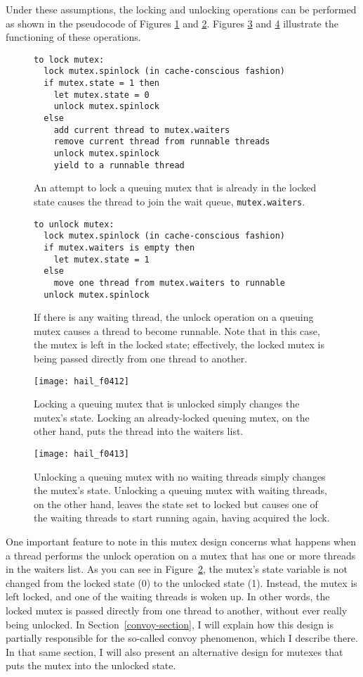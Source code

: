Under these assumptions, the locking and unlocking operations can be
performed as shown in the pseudocode of Figures \ref{lock-pseudo-code} and
\ref{unlock-pseudo-code}.  Figures \ref{scan-4-5} and \ref{scan-4-6}
illustrate the functioning of these operations.
\begin{figure}
\begin{verbatim}
to lock mutex:
  lock mutex.spinlock (in cache-conscious fashion)
  if mutex.state = 1 then
    let mutex.state = 0
    unlock mutex.spinlock
  else
    add current thread to mutex.waiters
    remove current thread from runnable threads
    unlock mutex.spinlock
    yield to a runnable thread
\end{verbatim}
\caption{An attempt to lock a queuing mutex that is already in the
  locked state causes the thread to join the wait queue, {\tt mutex.waiters}.}
\label{lock-pseudo-code}
\end{figure}
\begin{figure}
\begin{verbatim}
to unlock mutex:
  lock mutex.spinlock (in cache-conscious fashion)
  if mutex.waiters is empty then
    let mutex.state = 1
  else
    move one thread from mutex.waiters to runnable
  unlock mutex.spinlock
\end{verbatim}
\caption{If there is any waiting thread, the unlock operation on a queuing mutex causes a thread to become
  runnable. Note that in this case, the mutex is left in the locked
  state; effectively, the locked mutex is being passed directly from
  one thread to another.}
\label{unlock-pseudo-code}
\end{figure}
\begin{figure}
\centerline{\texttt{[image: hail\_f0412]}}
\caption{Locking a queuing mutex that is unlocked simply changes the
  mutex's state.  Locking an already-locked queuing mutex, on the
  other hand, puts the thread into the waiters list.}
\label{scan-4-5}
\end{figure}
\begin{figure}
\centerline{\texttt{[image: hail\_f0413]}}
\caption{Unlocking a queuing mutex with no waiting threads simply
  changes the mutex's state.  Unlocking a queuing mutex with waiting
  threads, on the other hand, leaves the state set to locked but
  causes one of the waiting threads to start running again, having
  acquired the lock.}
\label{scan-4-6}
\end{figure}
One important feature to note in this mutex design concerns what
happens when a thread performs the unlock operation on a mutex that has one or more threads in the
waiters list.  As you can see in Figure~\ref{unlock-pseudo-code}, the
mutex's state variable is not changed from the locked state (0) to the
unlocked state (1).  Instead, the mutex is left locked, and one of the
waiting threads is woken up.  In other words, the locked mutex is
passed directly from one thread to another, without ever really being
unlocked.  In Section~\ref{convoy-section}, I will explain how this
design is partially responsible for the so-called convoy
phenomenon, which I describe there.  In that same section, I will also present an
alternative design for mutexes that puts the mutex into the unlocked
state.

